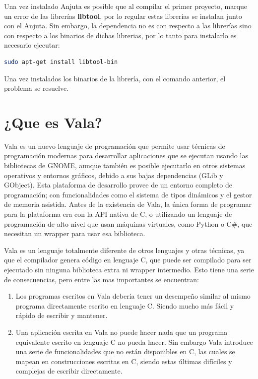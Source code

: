 \documentclass[12pt,twoside]{book}
\begin{document}
Una vez instalado Anjuta es posible que al compilar el primer proyecto, marque un error de las librerías \textbf{libtool}, por lo regular estas librerías se instalan junto con el Anjuta. Sin embargo, la dependencia no es con respecto a las librerías sino con respecto a los binarios de dichas librerias, por lo tanto para instalarlo es necesario ejecutar:

\begin{lstlisting}[language=bash]
sudo apt-get install libtool-bin
\end{lstlisting}

Una vez instalados los binarios de la librería, con el comando anterior, el problema se resuelve.
\section{¿Que es Vala?}
Vala es un nuevo lenguaje de programación que permite usar técnicas de programación modernas para desarrollar aplicaciones que se ejecutan usando las bibliotecas de GNOME, aunque también es posible ejecutarlo en otros sistemas operativos y entornos gráficos, debido a sus bajas dependencias (GLib y GObject). Esta plataforma de desarrollo provee de un entorno completo de programación; con funcionalidades como el sistema de tipos dinámicos y el gestor de memoria asistida. Antes de la existencia de Vala, la única forma de programar para la plataforma era con la API nativa de C, o utilizando un lenguaje de programación de alto nivel que usan máquinas virtuales, como Python o C\#, que necesitan un wrapper para usar esa biblioteca.


Vala es un lenguaje totalmente diferente de otros lenguajes y otras técnicas, ya que el compilador genera código en lenguaje C, que puede ser compilado para ser ejecutado sin ninguna biblioteca extra ni wrapper intermedio. Esto tiene una serie de consecuencias, pero entre las mas importantes se encuentran:

\begin{enumerate}
	\item Los programas escritos en Vala debería tener un desempeño similar al mismo programa directamente escrito en lenguaje C. Siendo mucho más fácil y rápido de escribir y mantener.
	\item Una aplicación escrita en Vala no puede hacer nada que un programa equivalente escrito en lenguaje C no pueda hacer. Sin embargo Vala introduce una serie de funcionalidades que no están disponibles en C, las cuales se mapean en construcciones escritas en C, siendo estas últimas difíciles y complejas de escribir directamente.
\end{enumerate}
\end{document}
